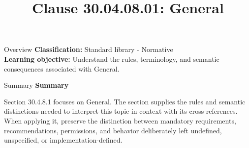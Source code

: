 \documentclass[10pt,letterpaper]{article}
\title{Clause 30.04.08.01: General}
\author{}
\date{}
\begin{document}
\maketitle
\begin{CornellOverviewBox}{Overview}
\textbf{Classification:} Standard library - Normative\\[2pt]
\textbf{Learning objective:} Understand the rules, terminology, and semantic consequences associated with General.
\end{CornellOverviewBox}\begin{CornellSummaryBox}{Summary}
{\sffamily\bfseries\color{Accent} Summary}\par\vspace{3pt}Section 30.4.8.1 focuses on General. The section supplies the rules and semantic distinctions needed to interpret this topic in context with its cross-references. When applying it, preserve the distinction between mandatory requirements, recommendations, permissions, and behavior deliberately left undefined, unspecified, or implementation-defined.
\end{CornellSummaryBox}
\end{document}
